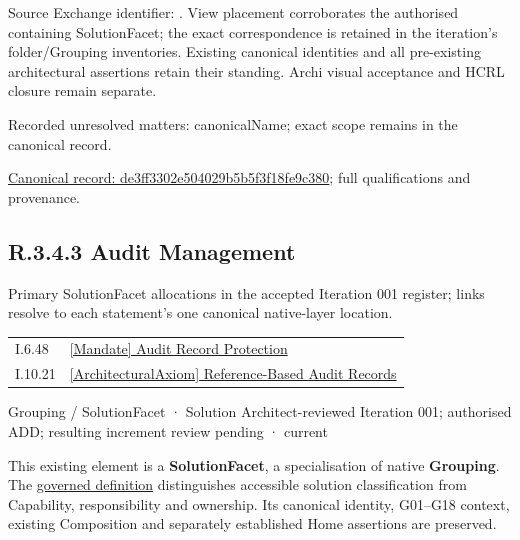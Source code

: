 Source Exchange identifier: \texttt{}. View placement corroborates
the authorised containing SolutionFacet; the exact correspondence is retained in the
iteration's folder/Grouping inventories. Existing canonical identities and all
pre-existing architectural assertions retain their standing. Archi visual
acceptance and HCRL closure remain separate.


{\small Recorded unresolved matters: canonicalName; exact scope remains in the canonical record.}\par
{\footnotesize \href{../../../../../../../continuum/grouping/de3ff3302e504029b5b5f3f18fe9c380.md}{Canonical record: de3ff3302e504029b5b5f3f18fe9c380}; full qualifications and provenance.}\par
\subsection*{R.3.4.3 Audit Management}
\label{navigation:R.3.4.3}

Primary SolutionFacet allocations in the accepted Iteration 001 register; links resolve to each statement’s one canonical native-layer location.\par
\begin{longtable}{p{.22\linewidth}p{.73\linewidth}}
I.6.48 & \hyperref[element:de15359269cf45adb646a435c18306f8]{[Mandate] Audit Record Protection} \\
I.10.21 & \hyperref[element:9202f9b1adf84d4882a507a2d7280710]{[ArchitecturalAxiom] Reference-Based Audit Records} \\
\end{longtable}
\label{element:de791c4976f84676bf8545b1cfb8bf41}
{\small Grouping / SolutionFacet · Solution Architect-reviewed Iteration 001; authorised ADD; resulting increment review pending · current}\par

This existing element is a \textbf{SolutionFacet}, a specialisation of native
\textbf{Grouping}. The \href{\detokenize{../../../../../../../governance/continuum-representation.md#solutionfacet-classification--1119-candidate}}{governed definition}
distinguishes accessible solution classification from Capability, responsibility
and ownership. Its canonical identity, G01–G18 context, existing Composition
and separately established Home assertions are preserved.



